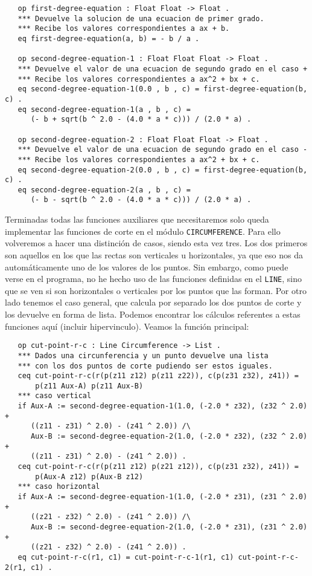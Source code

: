 {\codesize
\begin{verbatim}
   op first-degree-equation : Float Float -> Float .
   *** Devuelve la solucion de una ecuacion de primer grado.
   *** Recibe los valores correspondientes a ax + b.
   eq first-degree-equation(a, b) = - b / a .

   op second-degree-equation-1 : Float Float Float -> Float .
   *** Devuelve el valor de una ecuacion de segundo grado en el caso +
   *** Recibe los valores correspondientes a ax^2 + bx + c.
   eq second-degree-equation-1(0.0 , b , c) = first-degree-equation(b, c) .
   eq second-degree-equation-1(a , b , c) = 
      (- b + sqrt(b ^ 2.0 - (4.0 * a * c))) / (2.0 * a) . 

   op second-degree-equation-2 : Float Float Float -> Float .
   *** Devuelve el valor de una ecuacion de segundo grado en el caso -
   *** Recibe los valores correspondientes a ax^2 + bx + c.
   eq second-degree-equation-2(0.0 , b , c) = first-degree-equation(b, c) .
   eq second-degree-equation-2(a , b , c) = 
      (- b - sqrt(b ^ 2.0 - (4.0 * a * c))) / (2.0 * a) .
\end{verbatim}
}

Terminadas todas las funciones auxiliares que necesitaremos solo queda implementar las funciones de corte en el módulo \texttt{CIRCUMFERENCE}. Para ello volveremos a hacer una distinción de casos, siendo esta vez tres. Los dos primeros son aquellos en los que las rectas son verticales u horizontales, ya que eso nos da automáticamente uno de los valores de los puntos. Sin embargo, como puede verse en el programa, no he hecho uso de las funciones definidas en el \texttt{LINE}, sino que se ven si son horizontales o verticales por los puntos que las forman. Por otro lado tenemos el caso general, que calcula por separado los dos puntos de corte y los devuelve en forma de lista. Podemos encontrar los cálculos referentes a estas funciones aquí (incluir hipervinculo). Veamos la función principal:

{\codesize
\begin{verbatim}
   op cut-point-r-c : Line Circumference -> List .
   *** Dados una circunferencia y un punto devuelve una lista 
   *** con los dos puntos de corte pudiendo ser estos iguales.
   ceq cut-point-r-c(r(p(z11 z12) p(z11 z22)), c(p(z31 z32), z41)) = 
       p(z11 Aux-A) p(z11 Aux-B)
   *** caso vertical 
   if Aux-A := second-degree-equation-1(1.0, (-2.0 * z32), (z32 ^ 2.0) + 
      ((z11 - z31) ^ 2.0) - (z41 ^ 2.0)) /\
      Aux-B := second-degree-equation-2(1.0, (-2.0 * z32), (z32 ^ 2.0) + 
      ((z11 - z31) ^ 2.0) - (z41 ^ 2.0)) .
   ceq cut-point-r-c(r(p(z11 z12) p(z21 z12)), c(p(z31 z32), z41)) = 
       p(Aux-A z12) p(Aux-B z12)
   *** caso horizontal
   if Aux-A := second-degree-equation-1(1.0, (-2.0 * z31), (z31 ^ 2.0) + 
      ((z21 - z32) ^ 2.0) - (z41 ^ 2.0)) /\
      Aux-B := second-degree-equation-2(1.0, (-2.0 * z31), (z31 ^ 2.0) + 
      ((z21 - z32) ^ 2.0) - (z41 ^ 2.0)) .
   eq cut-point-r-c(r1, c1) = cut-point-r-c-1(r1, c1) cut-point-r-c-2(r1, c1) .
\end{verbatim}
}

